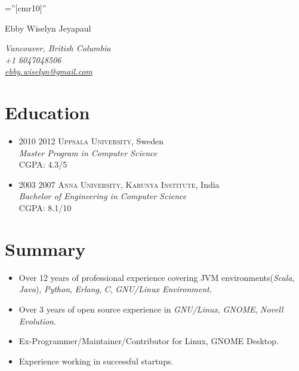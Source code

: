 \documentclass[a4paper,10pt]{article}
\begin{document}

\pagestyle{empty} %

\font\fb=''[cmr10]'' %

\par{\centering
		{\Large Ebby Wiselyn Jeyapaul
	        }\smallskip
\par}

\begin{flushright}
  \emph{Vancouver, British Columbia} \\
  \emph{+1 6047048506} \\
  \emph{\href{mailto:ebby.wiselyn@gmail.com}{ebby.wiselyn@gmail.com}} \\
\end{flushright}

\section{Education}
\begin{itemize}

\item \textsc{2010 2012} \textsc{Uppsala University}, Sweden \\
\emph{Master Program in Computer Science}\\
\normalsize \textsc{CGPA}: 4.3/5

\item \textsc{2003 2007} \textsc{Anna University, Karunya Institute}, India \\
\emph{Bachelor of Engineering in Computer Science}\\
\normalsize \textsc{CGPA}: 8.1/10

\end{itemize}

\section{Summary}
  \begin{itemize}
  \item Over 12 years of professional experience covering JVM environments(\emph{Scala}, \emph{Java}), \emph{Python}, \emph{Erlang}, \emph{C}, \emph{GNU/Linux Environment}.
  \item Over 3 years of open source experience in \emph{GNU/Linux}, \emph{GNOME}, \emph{Novell Evolution}.
  \item Ex-Programmer/Maintainer/Contributor for Linux, GNOME Desktop.
  \item Experience working in successful startups.
  \end{itemize}
\end{document}
